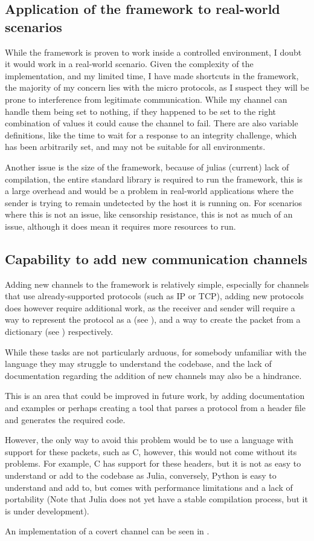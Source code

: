 \subsection{Application of the framework to real-world scenarios}

While the framework is proven to work inside a controlled environment, I doubt it would work in a real-world scenario. Given the complexity of the implementation, and my limited time, I have made shortcuts in the framework, the majority of my concern lies with the micro protocols, as I suspect they will be prone to interference from legitimate communication. While my channel can handle them being set to nothing, if they happened to be set to the right combination of values it could cause the channel to fail. There are also variable definitions, like the time to wait for a response to an integrity challenge, which has been arbitrarily set, and may not be suitable for all environments.

Another issue is the size of the framework, because of julias (current) lack of compilation, the entire standard library is required to run the framework, this is a large overhead and would be a problem in real-world applications where the sender is trying to remain undetected by the host it is running on. For scenarios where this is not an issue, like censorship resistance, this is not as much of an issue, although it does mean it requires more resources to run.


\subsection{Capability to add new communication channels}

Adding new channels to the framework is relatively simple, especially for channels that use already-supported protocols (such as IP or TCP), adding new protocols does however require additional work, as the receiver and sender will require a way to represent the protocol as a  (see ), and a way to create the packet from a dictionary (see ) respectively.

While these tasks are not particularly arduous, for somebody unfamiliar with the language they may struggle to understand the codebase, and the lack of documentation regarding the addition of new channels may also be a hindrance.

This is an area that could be improved in future work, by adding documentation and examples or perhaps creating a tool that parses a protocol from a header file and generates the required code.

However, the only way to avoid this problem would be to use a language with support for these packets, such as C, however, this would not come without its problems. For example, C has support for these headers, but it is not as easy to understand or add to the codebase as Julia, conversely, Python is easy to understand and add to, but comes with performance limitations and a lack of portability (Note that Julia does not yet have a stable compilation process, but it is under development).

An implementation of a covert channel can be seen in .